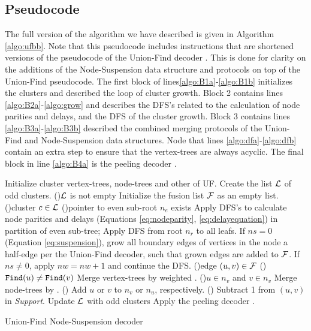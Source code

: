 \subsection{Pseudocode}\label{sec:pseudocode}

The full version of the algorithm we have described is given in Algorithm \ref{algo:ufbb}. Note that this pseudocode includes instructions that are shortened versions of the pseudocode of the Union-Find decoder \cite{delfosse2017almost}. This is done for clarity on the additions of the Node-Suspension data structure and protocols on top of the Union-Find pseudocode. The first block  of lines\ref{algo:B1a}-\ref{algo:B1b} initializes the clusters and described the loop of cluster growth. Block 2 contains lines \ref{algo:B2a}-\ref{algo:grow} and describes the DFS's related to the calculation of node parities and delays, and the DFS of the cluster growth. Block 3 contains lines \ref{algo:B3a}-\ref{algo:B3b} described the combined merging protocols of the Union-Find and Node-Suspension data structures. Node that lines \ref{algo:dfa}-\ref{algo:dfb} contain an extra step to ensure that the vertex-trees are always acyclic. The final block in line \ref{algo:B4a} is the peeling decoder \cite{delfosse2017linear}. 

\begin{algorithm}[htb]
    \BlankLine
    \BlankLine
    Initialize cluster vertex-trees, node-trees and other of UF.\;\label{algo:B1a}
    Create the list $\mathcal{L}$ of odd clusters.\;
    \While(){$\mathcal{L}$ is not empty}{
      Initialize the fusion list $\mathcal{F}$ as an empty list.\;\label{algo:B1b}
      \For(){cluster $c\in\mathcal{L}$ \label{algo:B2a}}{
        \If(){pointer to even sub-root $n_e$ exists}{
          Apply DFS's to calculate node parities and delays (Equations \eqref{eq:nodeparity}, \eqref{eq:delayequation}) in partition of even sub-tree;\label{algo:pdc}
        }
        Apply DFS from root $n_r$ to all leafs. If $ns=0$ (Equation \eqref{eq:suspension}), grow all boundary edges of vertices in the node a half-edge per the Union-Find decoder, such that grown edges are added to $\mathcal{F}$. If $ns\neq0$, apply $nw=nw+1$ and continue the DFS.\;\label{algo:grow}
      }
      \For(){edge $(u,v) \in \mathcal{F}$\label{algo:B3a}}{
        \eIf(){$\texttt{Find}(u)\neq\texttt{Find}(v)$}{
          Merge vertex-trees by weighted .\;
          \eIf(){$u \in n_v$ and $v \in n_v$\label{algo:joina}}{
            Merge node-trees by .\;
          }(){
            Add $u$ or $v$ to $n_v$ or $n_u$, respectively.\;\label{algo:joinb}
          }
        }(\label{algo:dfa}){
          Subtract 1 from $(u,v)$ in \emph{Support}.\;\label{algo:dfb}
        }
      }
      Update $\mathcal{L}$ with odd clusters\; \label{algo:B3b}
    }
    Apply the peeling decoder \cite{delfosse2017linear}.\label{algo:B4a}
    \caption{Union-Find Node-Suspension decoder}\label{algo:ufbb}
  \end{algorithm}
    
\FloatBarrier